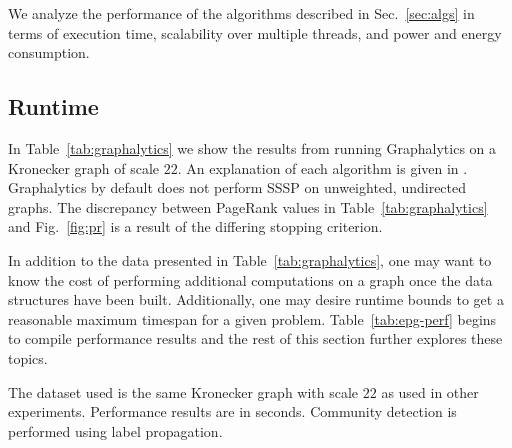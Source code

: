 \documentclass{llncs}
\begin{document}
We analyze the performance of the algorithms described in Sec.~\ref{sec:algs} in terms of execution time, scalability over multiple threads, and power and energy consumption.

\subsection{Runtime}

In Table~\ref{tab:graphalytics} we show the results from running Graphalytics on a Kronecker graph of scale $22$. An explanation of each algorithm is given in \cite{Iosup:2016:Graphalyticstech}. Graphalytics by default does not perform SSSP on unweighted, undirected graphs. The discrepancy between PageRank values in Table~\ref{tab:graphalytics} and Fig.~\ref{fig:pr} is a result of the differing stopping criterion.

In addition to the data presented in Table~\ref{tab:graphalytics}, one may want to know the cost of performing additional computations on a graph once the data structures have been built. Additionally, one may desire runtime bounds to get a reasonable maximum timespan for a given problem. Table~\ref{tab:epg-perf} begins to compile performance results and the rest of this section further explores these topics.


\begin{table}
	\caption{The dataset used is the same Kronecker graph with scale $22$ as used in other experiments. Performance results are in seconds. Community detection is performed using label propagation.}
	\centering
	\label{tab:graphalytics}
\end{table}
\end{document}
